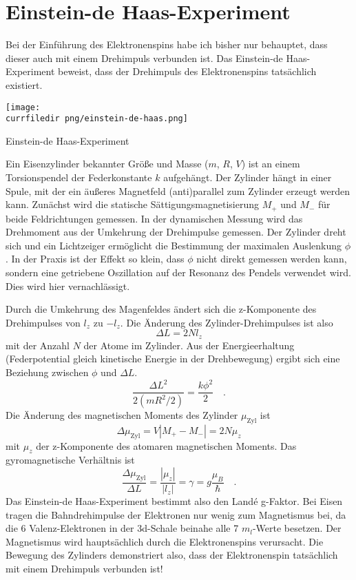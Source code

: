 \section{Einstein-de Haas-Experiment}


Bei der Einführung des Elektronenspins habe ich bisher nur behauptet, dass dieser auch mit einem Drehimpuls verbunden ist. Das Einstein-de Haas-Experiment beweist, dass der Drehimpuls des Elektronenspins tatsächlich existiert.

\begin{marginfigure}
    \texttt{[image: \\currfiledir png/einstein-de-haas.png]}
    \caption{Einstein-de Haas-Experiment}
\end{marginfigure}

Ein Eisenzylinder bekannter Größe und Masse ($m$, $R$, $V$) ist an einem Torsionspendel der Federkonstante $k$ aufgehängt. Der Zylinder hängt in einer Spule, mit der ein äußeres Magnetfeld (anti)parallel zum Zylinder erzeugt werden kann. Zunächst wird die statische Sättigungsmagnetisierung $M_+$ und $M_-$ für beide Feldrichtungen gemessen. In der dynamischen Messung wird das Drehmoment aus der Umkehrung der Drehimpulse gemessen. Der Zylinder dreht sich und ein Lichtzeiger ermöglicht die Bestimmung der maximalen Auslenkung $\phi$. In der Praxis ist der Effekt so klein, dass $\phi$ nicht direkt gemessen werden kann, sondern eine getriebene Oszillation auf der Resonanz des Pendels verwendet wird. Dies wird hier vernachlässigt. 

Durch die Umkehrung des Magenfeldes ändert sich die z-Komponente des Drehimpulses von $l_z$ zu $-l_z$. Die Änderung des Zylinder-Drehimpulses ist also 
\begin{equation}
    \Delta L = 2 N l_z
\end{equation}
mit der Anzahl $N$ der Atome im Zylinder. Aus der Energieerhaltung (Federpotential gleich kinetische Energie in der Drehbewegung) ergibt sich eine Beziehung zwischen $\phi$ und $\Delta L$.
\begin{equation}
\frac{\Delta L ^2}{2 (mR^2/2)} = \frac{k \phi^2}{2}    \quad .  
\end{equation}
Die Änderung des magnetischen  Moments des Zylinder $\mu_\text{Zyl}$ ist
\begin{equation}
   \Delta  \mu_\text{Zyl} = V | M_+ - M_-| = 2 N \mu_z
\end{equation}
mit $\mu_z$ der z-Komponente des atomaren magnetischen Moments. Das gyromagnetische Verhältnis ist
\begin{equation}
    \frac{ \Delta  \mu_\text{Zyl}}{\Delta L}
    = \frac{|\mu_z|}{|l_z|} = \gamma = g \frac{\mu_B}{\hbar}  \quad .
\end{equation}
Das Einstein-de Haas-Experiment bestimmt also den Landé g-Faktor. Bei Eisen tragen die Bahndrehimpulse der Elektronen nur wenig zum Magnetismus bei, da die 6 Valenz-Elektronen in der  3d-Schale beinahe alle 7 $m_l$-Werte besetzen. 
Der Magnetismus wird hauptsächlich durch die Elektronenspins verursacht. Die Bewegung des Zylinders demonstriert also, dass der Elektronenspin tatsächlich mit einem Drehimpuls verbunden ist! 

